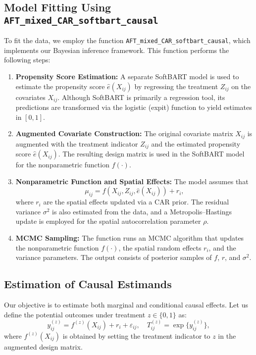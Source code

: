 \documentclass[useAMS,referee]{biom}
\begin{document}
\subsection{Model Fitting Using \texttt{AFT\_mixed\_CAR\_softbart\_causal}}

To fit the data, we employ the function \texttt{AFT\_mixed\_CAR\_softbart\_causal}, which implements our Bayesian inference framework. This function performs the following steps:
\begin{enumerate}
    \item \textbf{Propensity Score Estimation:}  
    A separate SoftBART model is used to estimate the propensity score \(\hat{e}(X_{ij})\) by regressing the treatment \(Z_{ij}\) on the covariates \(X_{ij}\). Although SoftBART is primarily a regression tool, its predictions are transformed via the logistic (expit) function to yield estimates in \([0,1]\).

    \item \textbf{Augmented Covariate Construction:}  
    The original covariate matrix \(X_{ij}\) is augmented with the treatment indicator \(Z_{ij}\) and the estimated propensity score \(\hat{e}(X_{ij})\). The resulting design matrix is used in the SoftBART model for the nonparametric function \(f(\cdot)\).

    \item \textbf{Nonparametric Function and Spatial Effects:}  
    The model assumes that
    \[
    \mu_{ij} = f(X_{ij}, Z_{ij}, \hat{e}(X_{ij})) + r_i,
    \]
    where \(r_i\) are the spatial effects updated via a CAR prior. The residual variance \(\sigma^2\) is also estimated from the data, and a Metropolis–Hastings update is employed for the spatial autocorrelation parameter \(\rho\).
    
    \item \textbf{MCMC Sampling:}  
    The function runs an MCMC algorithm that updates the nonparametric function \(f(\cdot)\), the spatial random effects \(r_i\), and the variance parameters. The output consists of posterior samples of \(f\), \(r\), and \(\sigma^2\).
\end{enumerate}

\subsection{Estimation of Causal Estimands}

Our objective is to estimate both marginal and conditional causal effects. Let us define the potential outcomes under treatment \(z \in \{0,1\}\) as:
\[
y_{ij}^{(z)} = f^{(z)}(X_{ij}) + r_i + \varepsilon_{ij}, \quad T_{ij}^{(z)} = \exp\{y_{ij}^{(z)}\},
\]
where \(f^{(z)}(X_{ij})\) is obtained by setting the treatment indicator to \(z\) in the augmented design matrix.
\end{document}
